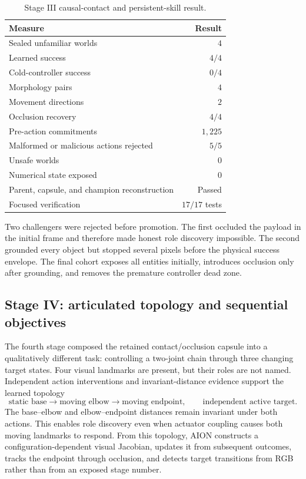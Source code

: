 \begin{table}[htbp]
\centering
\caption{Stage III causal-contact and persistent-skill result.}
\label{tab:rgb-contact-result}
\begin{tabular}{@{}lr@{}}
\toprule
\textbf{Measure} & \textbf{Result} \\
\midrule
Sealed unfamiliar worlds & $4$ \\
Learned success & $4/4$ \\
Cold-controller success & $0/4$ \\
Morphology pairs & $4$ \\
Movement directions & $2$ \\
Occlusion recovery & $4/4$ \\
Pre-action commitments & $1{,}225$ \\
Malformed or malicious actions rejected & $5/5$ \\
Unsafe worlds & $0$ \\
Numerical state exposed & $0$ \\
Parent, capsule, and champion reconstruction & Passed \\
Focused verification & $17/17$ tests \\
\bottomrule
\end{tabular}
\end{table}

Two challengers were rejected before promotion.  The first occluded the payload
in the initial frame and therefore made honest role discovery impossible.  The
second grounded every object but stopped several pixels before the physical
success envelope.  The final cohort exposes all entities initially, introduces
occlusion only after grounding, and removes the premature controller dead zone.

\subsection{Stage IV: articulated topology and sequential objectives}

The fourth stage composed the retained contact/occlusion capsule into a
qualitatively different task: controlling a two-joint chain through three
changing target states.  Four visual landmarks are present, but their roles are
not named.  Independent action interventions and invariant-distance evidence
support the learned topology
\begin{equation}
\label{eq:articulated-topology}
\text{static base}
\rightarrow \text{moving elbow}
\rightarrow \text{moving endpoint},
\qquad
\text{independent active target}.
\end{equation}
The base--elbow and elbow--endpoint distances remain invariant under both
actions.  This enables role discovery even when actuator coupling causes both
moving landmarks to respond.  From this topology, AION constructs a
configuration-dependent visual Jacobian, updates it from subsequent outcomes,
tracks the endpoint through occlusion, and detects target transitions from RGB
rather than from an exposed stage number.


